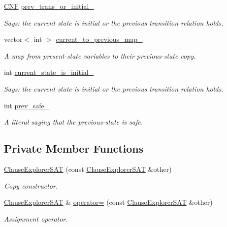 \begin{DoxyCompactItemize}
\hyperlink{classCNF}{C\-N\-F} \hyperlink{classClauseExplorerSAT_a445dd961b44b493e184ff42207132ea1}{prev\-\_\-trans\-\_\-or\-\_\-initial\-\_\-}
\begin{DoxyCompactList}\small\item\em Says\-: the current state is initial or the previous transition relation holds. \end{DoxyCompactList}\item 
vector$<$ int $>$ \hyperlink{classClauseExplorerSAT_aecf42678820d41d716fb23f833066da2}{current\-\_\-to\-\_\-previous\-\_\-map\-\_\-}
\begin{DoxyCompactList}\small\item\em A map from present-\/state variables to their previous-\/state copy. \end{DoxyCompactList}\item 
int \hyperlink{classClauseExplorerSAT_a210b4a062e0a949536b172d904a2219f}{current\-\_\-state\-\_\-is\-\_\-initial\-\_\-}
\begin{DoxyCompactList}\small\item\em Says\-: the current state is initial or the previous transition relation holds. \end{DoxyCompactList}\item 
int \hyperlink{classClauseExplorerSAT_ab98b3cf3447591b3e390e3d3a1d595e5}{prev\-\_\-safe\-\_\-}
\begin{DoxyCompactList}\small\item\em A literal saying that the previous-\/state is safe. \end{DoxyCompactList}\end{DoxyCompactItemize}
\subsection*{Private Member Functions}
\begin{DoxyCompactItemize}
\item 
\hyperlink{classClauseExplorerSAT_ad7a7e6be6d2450e716b2132308bdeeea}{Clause\-Explorer\-S\-A\-T} (const \hyperlink{classClauseExplorerSAT}{Clause\-Explorer\-S\-A\-T} \&other)
\begin{DoxyCompactList}\small\item\em Copy constructor. \end{DoxyCompactList}\item 
\hyperlink{classClauseExplorerSAT}{Clause\-Explorer\-S\-A\-T} \& \hyperlink{classClauseExplorerSAT_a1b2f9a77392cebd3e648d1696685e9b4}{operator=} (const \hyperlink{classClauseExplorerSAT}{Clause\-Explorer\-S\-A\-T} \&other)
\begin{DoxyCompactList}\small\item\em Assignment operator. \end{DoxyCompactList}\end{DoxyCompactItemize}


